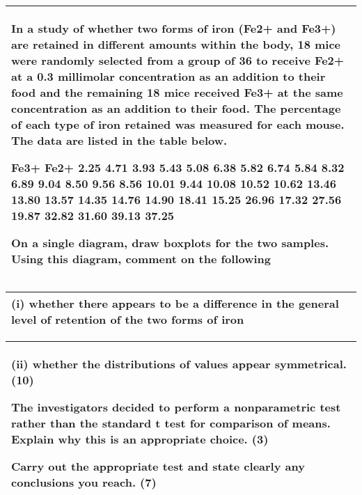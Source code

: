 \documentclass[a4paper,12pt]{article}
\begin{document}
\begin{table}[ht!]
 \centering
 \begin{tabular}{|p{15cm}|}
 \hline  
In a study of whether two forms of iron (Fe2+ and Fe3+) are retained in different amounts within the body, 18 mice were randomly selected from a group of 36 to receive Fe2+ at a 0.3 millimolar concentration as an addition to their food and the remaining 18 mice received Fe3+ at the same concentration as an addition to their food.  The percentage of each type of iron retained was measured for each mouse. The data are listed in the table below. 
 
Fe3+ Fe2+ 2.25 4.71 3.93 5.43 5.08 6.38 5.82 6.74 5.84 8.32 6.89 9.04 8.50 9.56 8.56 10.01 9.44 10.08 10.52 10.62 13.46 13.80 13.57 14.35 14.76 14.90 18.41 15.25 26.96 17.32 27.56 19.87 32.82 31.60 39.13 37.25 
 
On a single diagram, draw boxplots for the two samples.  Using this diagram, comment on the following
 


\\ \hline
  \end{tabular}
\end{table}

\begin{table}[ht!]
 \centering
 \begin{tabular}{|p{15cm}|}
 \hline  
 (i) whether there appears to be a difference in the general level of retention of the two forms of iron 
 \\ \hline
  \end{tabular}
\end{table}


\begin{table}[ht!]
 \centering
 \begin{tabular}{|p{15cm}|}
 \hline  
 
 (ii) whether the distributions of values appear symmetrical. 
(10) 
 
The investigators decided to perform a nonparametric test rather than the standard t test for comparison of means.  Explain why this is an appropriate choice. (3) 
 
Carry out the appropriate test and state clearly any conclusions you reach. 
(7) \\ \hline
  \end{tabular}
\end{table}
\end{document}
